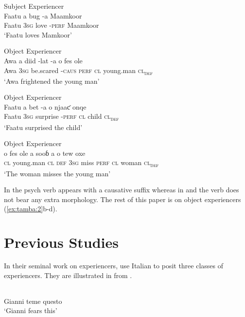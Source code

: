 \documentclass[output=paper]{langscibook}
\begin{document}
\ea \label{ex:tamba:2}
\ea Subject Experiencer \label{ex:tamba:2a}\\
\gll    Faatu    a              bug  {}-a              Maamkoor\\
        Faatu   \textsc{3sg}  love  {}-\textsc{perf}    Maamkoor\\
\glt    `Faatu loves Mamkoor'

\ex Object Experiencer \label{ex:tamba:2b}\\
\gll Awa a diid -lat -a o fes ole\\
    Awa \textsc{3sg} be.scared -\textsc{caus} \textsc{perf} \textsc{cl} young.man \textsc{cl\textsubscript{def}}\\
\glt `Awa frightened the young man'

\ex Object Experiencer \label{ex:tamba:2c}\\
\gll Faatu  a               bet         -a       o               njaaƈ       onqe\\
    Faatu   \textsc{3sg}    surprise    -\textsc{perf}  \textsc{cl}    child   \textsc{cl\textsubscript{def}} \\
\glt `Faatu surprised the child'


\ex Object Experiencer \label{ex:tamba:2d}\\
\gll o     fes             ole        a       sooɓ  a        o  tew   oxe\\
 \textsc{cl} young.man  \textsc{cl\textsubscript{} \textsc{def}}     \textsc{3sg}       miss  \textsc{perf}   \textsc{cl}  woman \textsc{cl\textsubscript{def}}\\
\glt   `The woman  misses the young man'
\z
\z 

In  the psych verb appears with a causative suffix whereas in   and  the verb does not bear any extra morphology. The rest of this paper is on object experiencers (\ref{ex:tamba:2}b-d).

\section{Previous Studies}

In their seminal work on experiencers, \citet{Belletti1988} use Italian to posit three classes of experiencers. They are illustrated in  from \citet[291--292]{Belletti1988}.

\ea \label{ex:tamba:3}
\\
\ea \label{ex:tamba:3a}
 Gianni teme questo\\
\glt `Gianni fears this'
\end{document}
